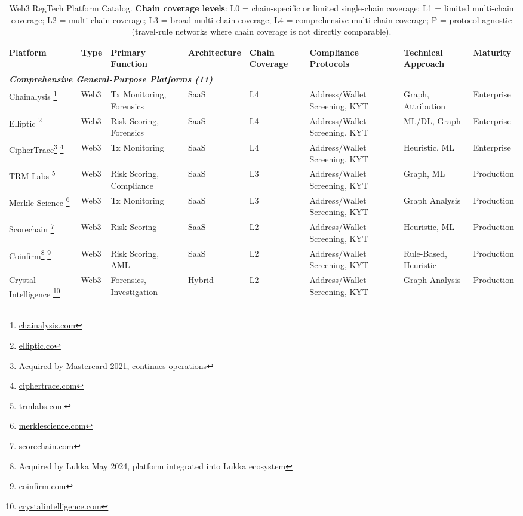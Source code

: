 \documentclass[conference,compsoc]{IEEEtran}
\begin{document}
\begin{table}[htbp]
\centering
\caption{Web3 RegTech Platform Catalog. \textbf{Chain coverage levels}: L0 = chain-specific or limited single-chain coverage; L1 = limited multi-chain coverage; L2 = multi-chain coverage; L3 = broad multi-chain coverage; L4 = comprehensive multi-chain coverage; P = protocol-agnostic (travel-rule networks where chain coverage is not directly comparable).}
\label{tab:platform_catalog}
\tiny
\begin{tabularx}{\textwidth}{p{1.5cm}p{0.9cm}X p{1.1cm}p{1.2cm}p{1.1cm}X p{0.9cm}}
\hline
\textbf{Platform} & \textbf{Type} & \textbf{Primary Function} & \textbf{Architecture} & \textbf{Chain Coverage} & \textbf{Compliance Protocols} & \textbf{Technical Approach} & \textbf{Maturity} \\
\hline
\multicolumn{8}{l}{\textit{\textbf{Comprehensive General-Purpose Platforms (11)}}} \\
\hline
Chainalysis \footnote{\url{chainalysis.com}} & Web3 & Tx Monitoring, Forensics & SaaS & L4 & Address/Wallet Screening, KYT & Graph, Attribution & Enterprise \\
Elliptic \footnote{\url{elliptic.co}} & Web3 & Risk Scoring, Forensics & SaaS & L4 & Address/Wallet Screening, KYT & ML/DL, Graph & Enterprise \\
CipherTrace\footnote{Acquired by Mastercard 2021, continues operations} \footnote{\url{ciphertrace.com}} & Web3 & Tx Monitoring & SaaS & L4 & Address/Wallet Screening, KYT & Heuristic, ML & Enterprise \\
TRM Labs \footnote{\url{trmlabs.com}} & Web3 & Risk Scoring, Compliance & SaaS & L3 & Address/Wallet Screening, KYT & Graph, ML & Production \\
Merkle Science \footnote{\url{merklescience.com}} & Web3 & Tx Monitoring & SaaS & L3 & Address/Wallet Screening, KYT & Graph Analysis & Production \\
Scorechain \footnote{\url{scorechain.com}} & Web3 & Risk Scoring & SaaS & L2 & Address/Wallet Screening, KYT & Heuristic, ML & Production \\
Coinfirm\footnote{Acquired by Lukka May 2024, platform integrated into Lukka ecosystem} \footnote{\url{coinfirm.com}} & Web3 & Risk Scoring, AML & SaaS & L2 & Address/Wallet Screening, KYT & Rule-Based, Heuristic & Production \\
Crystal Intelligence \footnote{\url{crystalintelligence.com}} & Web3 & Forensics, Investigation & Hybrid & L2 & Address/Wallet Screening, KYT & Graph Analysis & Production \\

\end{tabularx}
\end{table}
\end{document}
